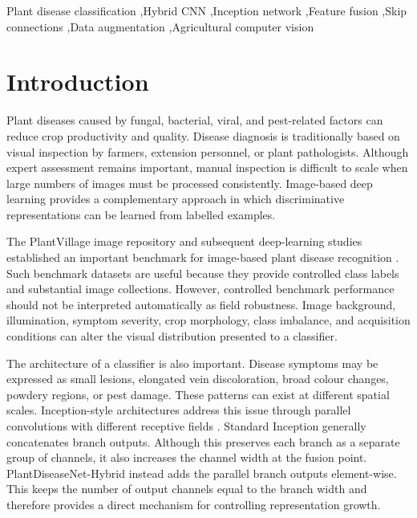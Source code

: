 \documentclass[a4paper,fleqn]{cas-dc}
\begin{document}
\begin{keywords}
Plant disease classification \sep Hybrid CNN \sep Inception network \sep Feature fusion \sep Skip connections \sep Data augmentation \sep Agricultural computer vision
\end{keywords}
\maketitle

\section{Introduction}
Plant diseases caused by fungal, bacterial, viral, and pest-related factors can reduce crop productivity and quality. Disease diagnosis is traditionally based on visual inspection by farmers, extension personnel, or plant pathologists. Although expert assessment remains important, manual inspection is difficult to scale when large numbers of images must be processed consistently. Image-based deep learning provides a complementary approach in which discriminative representations can be learned from labelled examples.

The PlantVillage image repository and subsequent deep-learning studies established an important benchmark for image-based plant disease recognition \citep{hughes2015,mohanty2016}. Such benchmark datasets are useful because they provide controlled class labels and substantial image collections. However, controlled benchmark performance should not be interpreted automatically as field robustness. Image background, illumination, symptom severity, crop morphology, class imbalance, and acquisition conditions can alter the visual distribution presented to a classifier.

The architecture of a classifier is also important. Disease symptoms may be expressed as small lesions, elongated vein discoloration, broad colour changes, powdery regions, or pest damage. These patterns can exist at different spatial scales. Inception-style architectures address this issue through parallel convolutions with different receptive fields \citep{szegedy2015}. Standard Inception generally concatenates branch outputs. Although this preserves each branch as a separate group of channels, it also increases the channel width at the fusion point. PlantDiseaseNet-Hybrid instead adds the parallel branch outputs element-wise. This keeps the number of output channels equal to the branch width and therefore provides a direct mechanism for controlling representation growth.
\end{document}
